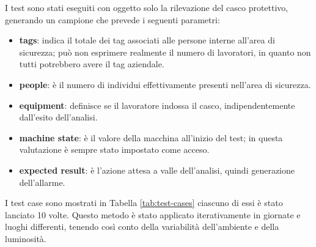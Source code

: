 I test sono stati eseguiti con oggetto solo la rilevazione del casco protettivo, generando un campione che prevede i seguenti parametri:

\begin{itemize}
	\item \textbf{tags}: indica il totale dei tag associati alle persone interne all'area di sicurezza; può non esprimere realmente il numero di lavoratori, in quanto non tutti potrebbero avere il tag aziendale.
	\item \textbf{people}: è il numero di individui effettivamente presenti nell'area di sicurezza. 
	\item \textbf{equipment}: definisce se il lavoratore indossa il casco, indipendentemente dall'esito dell'analisi.
	\item \textbf{machine state}: è il valore della macchina all'inizio del test; in questa valutazione è sempre stato impostato come acceso.
	\item \textbf{expected result}: è l'azione attesa a valle dell'analisi, quindi generazione dell'allarme. 
	
\end{itemize}	

I test case sono mostrati in Tabella \ref{tab:test-cases} ciascuno di essi è stato lanciato 10 volte. Questo metodo è stato applicato iterativamente in giornate e luoghi differenti, tenendo così conto della variabilità dell'ambiente e della luminosità.  


